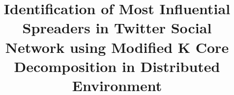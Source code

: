 \documentclass[sigconf]{acmart}
\begin{document}
\title{Identification of Most Influential Spreaders in Twitter Social Network using Modified K Core Decomposition in Distributed Environment}

\end{document}
